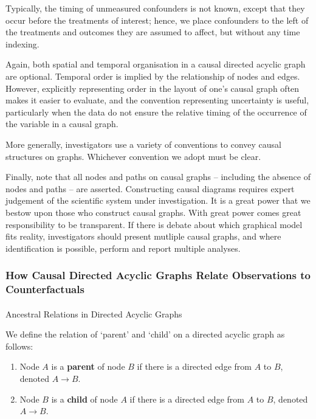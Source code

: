 \documentclass[
  single column]{article}
\makeatletter
\let\oldparagraph\paragraph
\renewcommand{\paragraph}{
    \@ifstar
      \xxxParagraphStar
      \xxxParagraphNoStar
  }
\newcommand{\xxxParagraphStar}[1]{\oldparagraph*{#1}\mbox{}}
\newcommand{\xxxParagraphNoStar}[1]{\oldparagraph{#1}\mbox{}}
\providecommand{\tightlist}{%
  \setlength{\itemsep}{0pt}\setlength{\parskip}{0pt}}\usepackage{longtable,booktabs,array}
\makeatother
\begin{document}
Typically, the timing of unmeasured confounders is not known, except
that they occur before the treatments of interest; hence, we place
confounders to the left of the treatments and outcomes they are assumed
to affect, but without any time indexing.

Again, both spatial and temporal organisation in a causal directed
acyclic graph are optional. Temporal order is implied by the
relationship of nodes and edges. However, explicitly representing order
in the layout of one's causal graph often makes it easier to evaluate,
and the convention representing uncertainty is useful, particularly when
the data do not ensure the relative timing of the occurrence of the
variable in a causal graph.

More generally, investigators use a variety of conventions to convey
causal structures on graphs. Whichever convention we adopt must be
clear.

Finally, note that all nodes and paths on causal graphs -- including the
absence of nodes and paths -- are asserted. Constructing causal diagrams
requires expert judgement of the scientific system under investigation.
It is a great power that we bestow upon those who construct causal
graphs. With great power comes great responsibility to be transparent.
If there is debate about which graphical model fits reality,
investigators should present mutliple causal graphs, and where
identification is possible, perform and report multiple analyses.

\subsubsection{How Causal Directed Acyclic Graphs Relate Observations to
Counterfactuals}\label{how-causal-directed-acyclic-graphs-relate-observations-to-counterfactuals}

\paragraph{Ancestral Relations in Directed Acyclic
Graphs}\label{ancestral-relations-in-directed-acyclic-graphs}

We define the relation of `parent' and `child' on a directed acyclic
graph as follows:

\begin{enumerate}
\def\labelenumi{\arabic{enumi}.}
\tightlist
\item
  Node \(A\) is a \textbf{parent} of node \(B\) if there is a directed
  edge from \(A\) to \(B\), denoted \(A \rightarrow B\).
\item
  Node \(B\) is a \textbf{child} of node \(A\) if there is a directed
  edge from \(A\) to \(B\), denoted \(A \rightarrow B\).
\end{enumerate}
\end{document}
